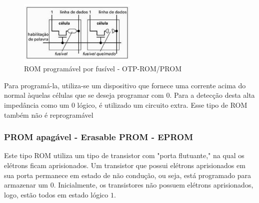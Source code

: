 \documentclass{article}
\begin{document}
\begin{figure}[h!] 
    \centering 
    \includegraphics[width=0.5\textwidth]{programacaoPROM.jpg}
    \caption{ROM programável por fusível - OTP-ROM/PROM} 
    \label{fig:fusívelPRom} 
\end{figure}

Para programá-la, utiliza-se um dispositivo que fornece uma corrente acima do normal àquelas células que se deseja programar com $0$. Para a detecção desta alta impedância como um $0$ lógico, é utilizado um circuito extra. Esse tipo de ROM também não é reprogramável



\subsubsection{PROM apagável - Erasable PROM - EPROM}
Este tipo ROM utiliza um tipo de transistor com "porta flutuante," na qual os elétrons ficam aprisionados. Um transistor que possui elétrons aprisionados em sua porta permanece em estado de não condução, ou seja, está programado para armazenar um $0$.
Inicialmente, os transistores não possuem elétrons aprisionados, logo, estão todos em estado lógico $1$.
\end{document}
